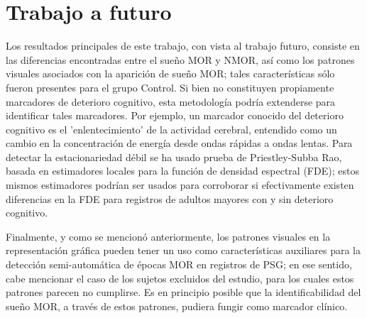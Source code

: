 
\section{Trabajo a futuro}

Los resultados principales de este trabajo, con vista al trabajo futuro, consiste en las 
diferencias encontradas entre el sueño MOR y NMOR, así como los patrones visuales asociados con 
la aparición de sueño MOR; tales características sólo fueron presentes para el grupo 
Control. Si bien no constituyen propiamente marcadores de deterioro cognitivo, esta metodología
podría extenderse para identificar tales marcadores.
Por ejemplo, un marcador conocido \cite{Becerra12} del deterioro cognitivo es el 'enlentecimiento' 
de la actividad cerebral, entendido como un cambio en la concentración de energía desde ondas 
rápidas a ondas lentas.
Para detectar la estacionariedad débil se ha usado prueba de Priestley-Subba Rao, basada en 
estimadores locales para la función de densidad espectral (FDE); estos mismos estimadores 
podrían ser usados para corroborar si efectivamente existen diferencias en la FDE para registros 
de adultos mayores con y sin deterioro cognitivo. 

Finalmente, y como se mencionó anteriormente, los patrones visuales en la representación 
gráfica pueden tener un uso como características auxiliares para la detección 
semi-automática de épocas MOR en registros de PSG; en ese sentido, cabe mencionar el caso de 
los sujetos excluidos del estudio, para los cuales estos patrones parecen no cumplirse. 
Es en principio posible que la identificabilidad del sueño MOR, a través de estos patrones, 
pudiera fungir como marcador clínico.

